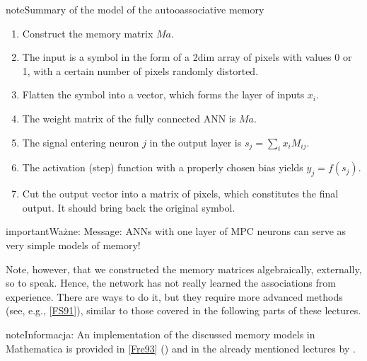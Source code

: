 \documentclass[a4paper,12pt,polish]{jupyterBook}
\begin{document}
\begin{sphinxadmonition}{note}{Summary of the model of the autooassociative memory}
\begin{enumerate}
%
\item {} 
\sphinxAtStartPar
Construct the memory matrix \(Ma\).

\item {} 
\sphinxAtStartPar
The input is a symbol in the form of a 2\sphinxhyphen{}dim array of pixels with values 0 or 1, with a
certain number of pixels randomly distorted.

\item {} 
\sphinxAtStartPar
Flatten the symbol into a vector, which forms the layer of inputs \(x_i\).

\item {} 
\sphinxAtStartPar
The weight matrix of the fully connected ANN is \(Ma\).

\item {} 
\sphinxAtStartPar
The signal entering neuron \(j\) in the output layer is \(s_j=\sum_i x_i M_{ij}\).

\item {} 
\sphinxAtStartPar
The activation (step) function with a properly chosen bias yields \(y_j=f(s_j)\).

\item {} 
\sphinxAtStartPar
Cut the output vector into a matrix of pixels, which constitutes the final output. It should bring back the original symbol.

\end{enumerate}
\end{sphinxadmonition}

\begin{sphinxadmonition}{important}{Ważne:}
\sphinxAtStartPar
Message: ANNs with one layer of MPC neurons can serve as very simple models of memory!
\end{sphinxadmonition}

\sphinxAtStartPar
Note, however, that we constructed the memory matrices algebraically, externally, so to speak. Hence, the network has not really learned the associations from experience. There are ways to do it, but they require more advanced methods (see, e.g., {[}\hyperlink{cite.docs/conclusion:id11}{FS91}{]}), similar to those covered in the following parts of these lectures.

\begin{sphinxadmonition}{note}{Informacja:}
\sphinxAtStartPar
An implementation of the discussed memory models in Mathematica is provided in
{[}\hyperlink{cite.docs/conclusion:id10}{Fre93}{]} () and in the already mentioned lectures by .
\end{sphinxadmonition}
\end{document}
